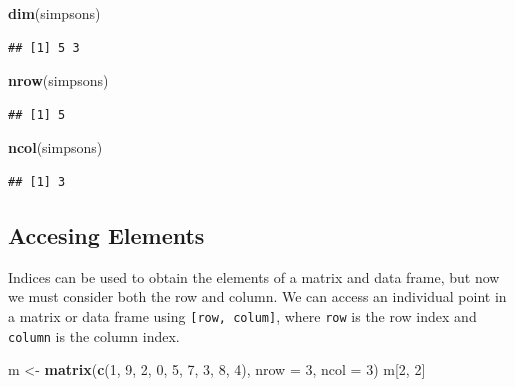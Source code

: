 \documentclass[
]{book}
\newenvironment{Shaded}{\begin{snugshade}}{\end{snugshade}}
\newcommand{\DataTypeTok}[1]{\textcolor[rgb]{0.13,0.29,0.53}{#1}}
\newcommand{\DecValTok}[1]{\textcolor[rgb]{0.00,0.00,0.81}{#1}}
\newcommand{\KeywordTok}[1]{\textcolor[rgb]{0.13,0.29,0.53}{\textbf{#1}}}
\newcommand{\NormalTok}[1]{#1}
\newcommand{\StringTok}[1]{\textcolor[rgb]{0.31,0.60,0.02}{#1}}
\begin{document}
\begin{Shaded}
\begin{Highlighting}[]
\KeywordTok{dim}\NormalTok{(simpsons)}
\end{Highlighting}
\end{Shaded}

\begin{verbatim}
## [1] 5 3
\end{verbatim}

\begin{Shaded}
\begin{Highlighting}[]
\KeywordTok{nrow}\NormalTok{(simpsons)}
\end{Highlighting}
\end{Shaded}

\begin{verbatim}
## [1] 5
\end{verbatim}

\begin{Shaded}
\begin{Highlighting}[]
\KeywordTok{ncol}\NormalTok{(simpsons)}
\end{Highlighting}
\end{Shaded}

\begin{verbatim}
## [1] 3
\end{verbatim}

\hypertarget{accesing-elements}{%
\subsection{Accesing Elements}\label{accesing-elements}}

Indices can be used to obtain the elements of a matrix and data frame, but now we must consider both the row and column. We can access an individual point in a matrix or data frame using \texttt{{[}row,\ colum{]}}, where \texttt{row} is the row index and \texttt{column} is the column index.

\begin{Shaded}
\begin{Highlighting}[]
\NormalTok{m <-}\StringTok{ }\KeywordTok{matrix}\NormalTok{(}\KeywordTok{c}\NormalTok{(}\DecValTok{1}\NormalTok{, }\DecValTok{9}\NormalTok{, }\DecValTok{2}\NormalTok{, }\DecValTok{0}\NormalTok{, }\DecValTok{5}\NormalTok{, }\DecValTok{7}\NormalTok{, }\DecValTok{3}\NormalTok{, }\DecValTok{8}\NormalTok{, }\DecValTok{4}\NormalTok{), }\DataTypeTok{nrow =} \DecValTok{3}\NormalTok{, }\DataTypeTok{ncol =} \DecValTok{3}\NormalTok{)}
\NormalTok{m[}\DecValTok{2}\NormalTok{, }\DecValTok{2}\NormalTok{]}
\end{Highlighting}
\end{Shaded}
\end{document}
